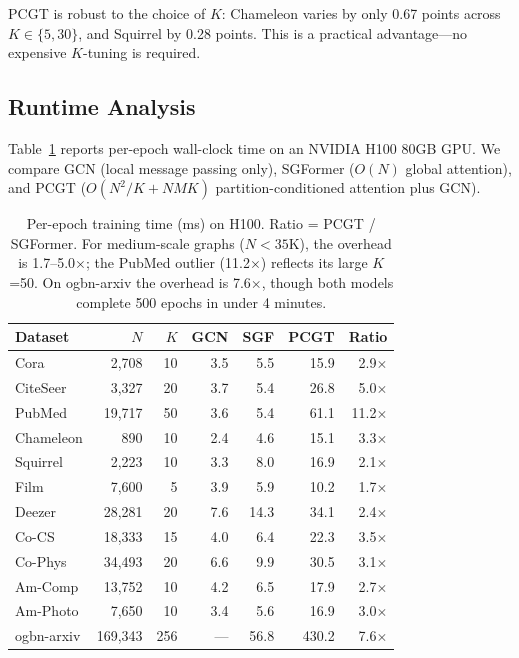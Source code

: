 \documentclass[sigconf]{acmart}
\begin{document}
\noindent PCGT is robust to the choice of $K$: Chameleon varies by only 0.67 points across $K \in \{5, 30\}$, and Squirrel by 0.28 points. This is a practical advantage---no expensive $K$-tuning is required.

\subsection{Runtime Analysis}

Table~\ref{tab:runtime} reports per-epoch wall-clock time on an NVIDIA H100 80GB GPU. We compare GCN (local message passing only), SGFormer ($O(N)$ global attention), and PCGT ($O(N^2/K + NMK)$ partition-conditioned attention plus GCN).

\begin{table}[t]
\centering
\small
\setlength{\tabcolsep}{3pt}
\begin{tabular}{l|r|r|rrr|r}
\toprule
\textbf{Dataset} & $N$ & $K$ & \textbf{GCN} & \textbf{SGF} & \textbf{PCGT} & \textbf{Ratio} \\
\midrule
Cora       &  2,708  & 10  & 3.5  & 5.5   & 15.9  & 2.9$\times$ \\
CiteSeer   &  3,327  & 20  & 3.7  & 5.4   & 26.8  & 5.0$\times$ \\
PubMed     & 19,717  & 50  & 3.6  & 5.4   & 61.1  & 11.2$\times$ \\
Chameleon  &    890  & 10  & 2.4  & 4.6   & 15.1  & 3.3$\times$ \\
Squirrel   &  2,223  & 10  & 3.3  & 8.0   & 16.9  & 2.1$\times$ \\
Film       &  7,600  & 5   & 3.9  & 5.9   & 10.2  & 1.7$\times$ \\
Deezer     & 28,281  & 20  & 7.6  & 14.3  & 34.1  & 2.4$\times$ \\
Co-CS      & 18,333  & 15  & 4.0  & 6.4   & 22.3  & 3.5$\times$ \\
Co-Phys    & 34,493  & 20  & 6.6  & 9.9   & 30.5  & 3.1$\times$ \\
Am-Comp    & 13,752  & 10  & 4.2  & 6.5   & 17.9  & 2.7$\times$ \\
Am-Photo   &  7,650  & 10  & 3.4  & 5.6   & 16.9  & 3.0$\times$ \\
\midrule
ogbn-arxiv & 169,343 & 256 & ---  & 56.8  & 430.2 & 7.6$\times$ \\
\bottomrule
\end{tabular}
\caption{Per-epoch training time (ms) on H100. Ratio = PCGT / SGFormer. For medium-scale graphs ($N < 35$K), the overhead is 1.7--5.0$\times$; the PubMed outlier (11.2$\times$) reflects its large $K$=50. On ogbn-arxiv the overhead is 7.6$\times$, though both models complete 500 epochs in under 4 minutes.}
\label{tab:runtime}
\end{table}
\end{document}

